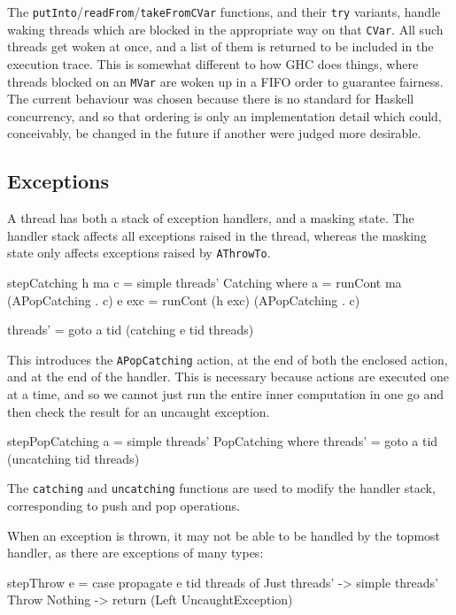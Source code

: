 The \verb|putInto|/\verb|readFrom|/\verb|takeFromCVar| functions, and
their \verb|try| variants, handle waking threads which are blocked in
the appropriate way on that \verb|CVar|. All such threads get woken at
once, and a list of them is returned to be included in the execution
trace. This is somewhat different to how GHC does things, where
threads blocked on an \verb|MVar| are woken up in a FIFO order to
guarantee fairness. The current behaviour was chosen because there is
no standard for Haskell concurrency, and so that ordering is only an
implementation detail which could, conceivably, be changed in the
future if another were judged more desirable.

\subsection{Exceptions}
\label{sec:execution-stepwise-exception}

A thread has both a stack of exception handlers, and a masking
state. The handler stack affects all exceptions raised in the thread,
whereas the masking state only affects exceptions raised by
\verb|AThrowTo|.

\begin{haskellcode}
stepCatching h ma c = simple threads' Catching where
  a     = runCont ma      (APopCatching . c)
  e exc = runCont (h exc) (APopCatching . c)

  threads' = goto a tid (catching e tid threads)
\end{haskellcode}

This introduces the \verb|APopCatching| action, at the end of both the
enclosed action, and at the end of the handler. This is necessary
because actions are executed one at a time, and so we cannot just run
the entire inner computation in one go and then check the result for
an uncaught exception.

\begin{haskellcode}
stepPopCatching a = simple threads' PopCatching where
  threads' = goto a tid (uncatching tid threads)
\end{haskellcode}

The \verb|catching| and \verb|uncatching| functions are used to modify
the handler stack, corresponding to push and pop operations.

When an exception is thrown, it may not be able to be handled by the
topmost handler, as there are exceptions of many types:

\begin{haskellcode}
stepThrow e = case propagate e tid threads of
    Just threads' -> simple threads' Throw
    Nothing -> return (Left UncaughtException)
\end{haskellcode}

